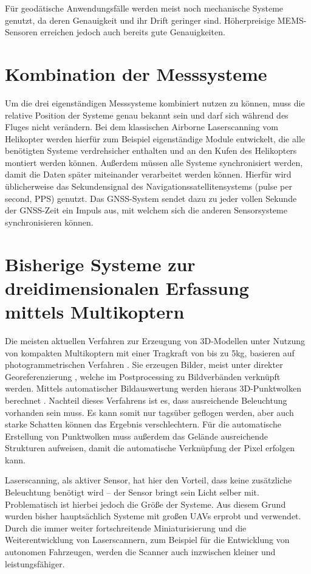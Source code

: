 \documentclass[a4paper,12pt,bibliography=totoc, listof=totoc,titlepage,pointlessnumbers]{scrreprt}
\begin{document}
Für geodätische Anwendungsfälle werden meist noch mechanische Systeme genutzt, da deren Genauigkeit und ihr Drift geringer sind. Höherpreisige MEMS-Sensoren erreichen jedoch auch bereits gute Genauigkeiten. \citep{imar}

\section{Kombination der Messsysteme}
Um die drei eigenständigen Messsysteme kombiniert nutzen zu können, muss die relative Position der Systeme genau bekannt sein und darf sich während des Fluges nicht verändern. Bei dem klassischen Air\-borne Laser\-scan\-ning vom Helikopter werden hierfür zum Beispiel eigenständige Module entwickelt, die alle benötigten Systeme verdrehsicher enthalten und an den Kufen des Helikopters montiert werden können. Außerdem müssen alle Systeme synchronisiert werden, damit die Daten später miteinander verarbeitet werden können. Hierfür wird üblicherweise das Sekundensignal des Navigationssatellitensystems (pulse per second, PPS) genutzt. Das GNSS-System sendet dazu zu jeder vollen Sekunde der GNSS-Zeit ein Impuls aus, mit welchem sich die anderen Sensorsysteme synchronisieren können. \citep[S. 23f]{beraldin}

\section{Bisherige Systeme zur dreidimensionalen Erfassung mittels Multikoptern}
Die meisten aktuellen Verfahren zur Erzeugung von 3D-Modellen unter Nutzung von kompakten Multikoptern mit einer Tragkraft von bis zu 5kg, basieren auf photogrammetrischen Verfahren \citep{carlos}. Sie erzeugen Bilder, meist unter direkter Georeferenzierung \cite[S. 16f]{uav}, welche im Postprocessing zu Bildverbänden verknüpft werden. Mittels automatischer Bildauswertung werden hieraus 3D-Punktwolken berechnet \cite[S. 18f]{uav}. Nachteil dieses Verfahrens ist es, dass ausreichende Beleuchtung vorhanden sein muss. Es kann somit nur tagsüber geflogen werden, aber auch starke Schatten können das Ergebnis verschlechtern. Für die automatische Erstellung von Punktwolken muss außerdem das Gelände ausreichende Strukturen aufweisen, damit die automatische Verknüpfung der Pixel erfolgen kann.

Laser\-scan\-ning, als aktiver Sensor, hat hier den Vorteil, dass keine zusätzliche Beleuchtung benötigt wird -- der Sensor bringt sein Licht selber mit. Problematisch ist hierbei jedoch die Größe der Systeme. Aus diesem Grund wurden bisher hauptsächlich Systeme mit großen UAVs erprobt und verwendet. Durch die immer weiter fortschreitende Miniaturisierung und die Weiterentwicklung von Laser\-scan\-nern, zum Beispiel für die Entwicklung von autonomen Fahrzeugen, werden die Scanner auch inzwischen kleiner und leistungsfähiger. \citep[S. 19]{uav}
\end{document}
